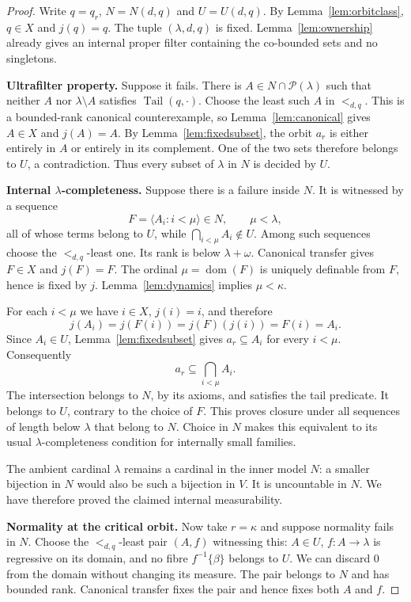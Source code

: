 \documentclass[11pt,letterpaper]{article}
\theoremstyle{definition}
\newcommand{\dom}{\operatorname{dom}}
\newcommand{\Pow}{\mathcal P}
\newcommand{\tail}{\operatorname{Tail}}
\newcommand{\seq}[1]{\langle #1\rangle}
\begin{document}
\begin{proof}
Write $q=q_r$, $N=N(d,q)$ and $U=U(d,q)$. By Lemma~\ref{lem:orbitclass}, $q\in X$ and $j(q)=q$. The tuple $(\lambda,d,q)$ is fixed. Lemma~\ref{lem:ownership} already gives an internal proper filter containing the co-bounded sets and no singletons.

\textbf{Ultrafilter property.}
Suppose it fails. There is $A\in N\cap\Pow(\lambda)$ such that neither $A$ nor $\lambda\setminus A$ satisfies $\tail(q,\cdot)$. Choose the least such $A$ in $<_{d,q}$. This is a bounded-rank canonical counterexample, so Lemma~\ref{lem:canonical} gives $A\in X$ and $j(A)=A$. By Lemma~\ref{lem:fixedsubset}, the orbit $a_r$ is either entirely in $A$ or entirely in its complement. One of the two sets therefore belongs to $U$, a contradiction. Thus every subset of $\lambda$ in $N$ is decided by $U$.

\textbf{Internal $\lambda$-completeness.}
Suppose there is a failure inside $N$. It is witnessed by a sequence
\[
                  F=\seq{A_i:i<\mu}\in N,\qquad \mu<\lambda,
\]
all of whose terms belong to $U$, while $\bigcap_{i<\mu}A_i\notin U$. Among such sequences choose the $<_{d,q}$-least one. Its rank is below $\lambda+\omega$. Canonical transfer gives $F\in X$ and $j(F)=F$. The ordinal $\mu=\dom(F)$ is uniquely definable from $F$, hence is fixed by $j$. Lemma~\ref{lem:dynamics} implies $\mu<\kappa$.

For each $i<\mu$ we have $i\in X$, $j(i)=i$, and therefore
\[
                     j(A_i)=j(F(i))=j(F)(j(i))=F(i)=A_i.
\]
Since $A_i\in U$, Lemma~\ref{lem:fixedsubset} gives $a_r\subseteq A_i$ for every $i<\mu$. Consequently
\[
                              a_r\subseteq\bigcap_{i<\mu}A_i.
\]
The intersection belongs to $N$, by its axioms, and satisfies the tail predicate. It belongs to $U$, contrary to the choice of $F$. This proves closure under all sequences of length below $\lambda$ that belong to $N$. Choice in $N$ makes this equivalent to its usual $\lambda$-completeness condition for internally small families.

The ambient cardinal $\lambda$ remains a cardinal in the inner model $N$: a smaller bijection in $N$ would also be such a bijection in $V$. It is uncountable in $N$. We have therefore proved the claimed internal measurability.

\textbf{Normality at the critical orbit.}
Now take $r=\kappa$ and suppose normality fails in $N$. Choose the $<_{d,q}$-least pair $(A,f)$ witnessing this: $A\in U$, $f:A\to\lambda$ is regressive on its domain, and no fibre $f^{-1}\{\beta\}$ belongs to $U$. We can discard $0$ from the domain without changing its measure. The pair belongs to $N$ and has bounded rank. Canonical transfer fixes the pair and hence fixes both $A$ and $f$.


\end{proof}
\end{document}

